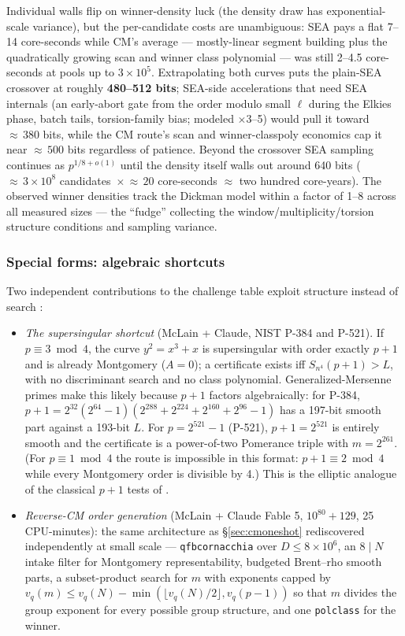 \documentclass[11pt]{amsart}
\newcommand{\smoothpart}[2]{S_{#1}(#2)}
\theoremstyle{plain}
\theoremstyle{definition}
\theoremstyle{remark}
\begin{document}
Individual walls flip on winner-density luck (the density draw has exponential-scale variance), but the
per-candidate costs are unambiguous: SEA pays a flat 7--14 core-seconds while CM's average ---
mostly-linear segment building plus the quadratically growing scan and winner class polynomial --- was
still 2--4.5 core-seconds at pools up to $3\times 10^5$.  Extrapolating both curves puts the plain-SEA
crossover at roughly \textbf{480--512 bits}; SEA-side accelerations that need SEA internals (an
early-abort gate from the order modulo small $\ell$ during the Elkies phase, batch tails, torsion-family
bias; modeled $\times$3--5) would pull it toward ${\approx}\,380$ bits, while the CM route's scan and
winner-classpoly economics cap it near ${\approx}\,500$ bits regardless of patience.  Beyond the
crossover SEA sampling continues as $p^{1/8+o(1)}$ until the density itself walls out around 640 bits
(${\approx}\,3\times 10^8$ candidates ${}\times{} {\approx}\,20$ core-seconds ${}\approx{}$ two hundred
core-years).  The observed winner densities track the Dickman model within a factor of 1--8 across all
measured sizes --- the ``fudge'' collecting the window/multiplicity/torsion structure conditions and
sampling variance.

\subsubsection{Special forms: algebraic shortcuts}\label{sec:shortcuts}
Two independent contributions to the challenge table exploit structure instead of search
\cite{OneShot}:
\begin{itemize}
\item \emph{The supersingular shortcut} (McLain + Claude, NIST P-384 and P-521).  If
$p \equiv 3 \bmod 4$, the curve $y^2 = x^3+x$ is supersingular with order exactly $p+1$ and is already
Montgomery ($A = 0$); a certificate exists iff $\smoothpart{n^4}{p+1} > L$, with no discriminant search
and no class polynomial.  Generalized-Mersenne primes make this likely because $p+1$ factors
algebraically: for P-384, $p+1 = 2^{32}(2^{64}-1)(2^{288}+2^{224}+2^{160}+2^{96}-1)$ has a 197-bit
smooth part against a 193-bit $L$.  For $p = 2^{521}-1$ (P-521), $p+1 = 2^{521}$ is entirely smooth and
the certificate is a power-of-two Pomerance triple with $m = 2^{261}$.  (For $p \equiv 1 \bmod 4$ the
route is impossible in this format: $p+1 \equiv 2 \bmod 4$ while every Montgomery order is divisible by
4.)  This is the elliptic analogue of the classical $p+1$ tests of \cite{BLS75}.
\item \emph{Reverse-CM order generation} (McLain + Claude Fable 5, $10^{80}+129$, 25 CPU-minutes): the
same architecture as \S\ref{sec:cmoneshot} rediscovered independently at small scale ---
\texttt{qfbcornacchia} over $D \le 8\times 10^6$, an $8 \mid N$ intake filter for Montgomery
representability, budgeted Brent--rho smooth parts, a subset-product search for $m$ with exponents
capped by $v_q(m) \le v_q(N) - \min(\lfloor v_q(N)/2\rfloor, v_q(p-1))$ so that $m$ divides the group
exponent for every possible group structure, and one \texttt{polclass} for the winner.
\end{itemize}
\end{document}
